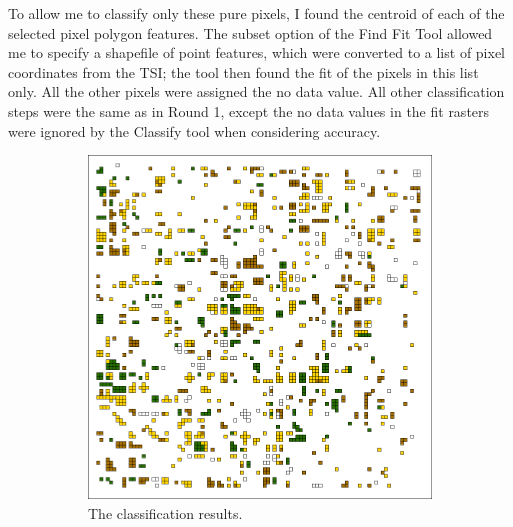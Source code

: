 To allow me to classify only these pure pixels, I found the centroid of each of the selected pixel polygon features. The subset option of the Find Fit Tool allowed me to specify a shapefile of point features, which were converted to a list of pixel coordinates from the TSI; the tool then found the fit of the pixels in this list only. All the other pixels were assigned the  no data value. All other classification steps were the same as in Round 1, except the no data values in the fit rasters were ignored by the Classify tool when considering accuracy.

\begin{Spacing}{1.0}
\begin{figure}
  \centering
  \begin{subfigure}[t]{.63\textwidth}
    \includegraphics[width=\textwidth]{Graphics/Testing/clip1_MODIS_round2.pdf}
    \caption{The classification results.}
    \label{subfig:ss1r2class}
  \end{subfigure}
  \\
  \vspace{.15in}
  \begin{subfigure}[t]{.63\textwidth}

\end{subfigure}
\end{figure}
\end{Spacing}
